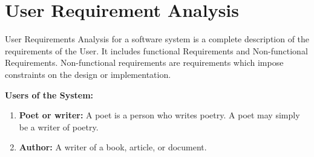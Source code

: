 \section{User Requirement Analysis}
User Requirements Analysis for a software system is a complete description of the requirements of the User. It includes functional Requirements
and Non-functional Requirements. Non-functional requirements are
requirements which impose constraints on the design or implementation.

 
{\bf Users of the System:}
    \begin{enumerate}
        \item \textbf{Poet or writer:} A poet is a person who writes poetry. A poet may simply be a writer of poetry.
        \item \textbf{Author:} A writer of a book, article, or document.        
    \end{enumerate}

